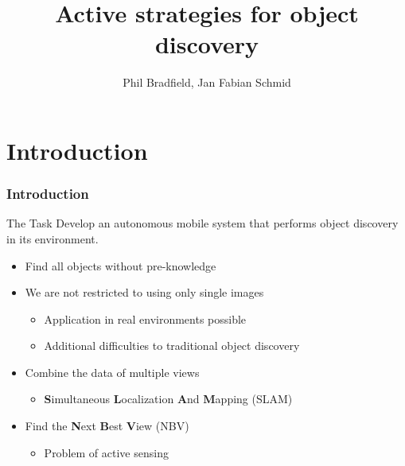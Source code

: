 \documentclass[t]{beamer} %
\title{  Active strategies for object discovery }
\author[]{Phil Bradfield, Jan Fabian Schmid}
\date[]{}
\institute[UHH] {Computer Vision Project\\ Winter 2016}
\begin{document}
\begin{frame}
  \titlepage
\end{frame}

\section{Introduction}

\begin{frame}
	\frametitle{ Introduction }
	\begin{block}{The Task}    
		Develop an autonomous mobile system that performs object discovery in its environment.
	\end{block}
	\begin{itemize}
		\item<1-> Find all objects without pre-knowledge
		\item<2-> We are not restricted to using only single images
		\begin{itemize}
			\item Application in real environments possible
			\item Additional difficulties to traditional object discovery
		\end{itemize}
		\item<3-> Combine the data of multiple views
		\begin{itemize}
			\item \textbf{S}imultaneous \textbf{L}ocalization \textbf{A}nd \textbf{M}apping (SLAM)
		\end{itemize}
		\item<4-> Find the \textbf{N}ext \textbf{B}est \textbf{V}iew (NBV)
		\begin{itemize}
			\item Problem of active sensing
		\end{itemize}
	\end{itemize}
\end{frame}
\end{document}
